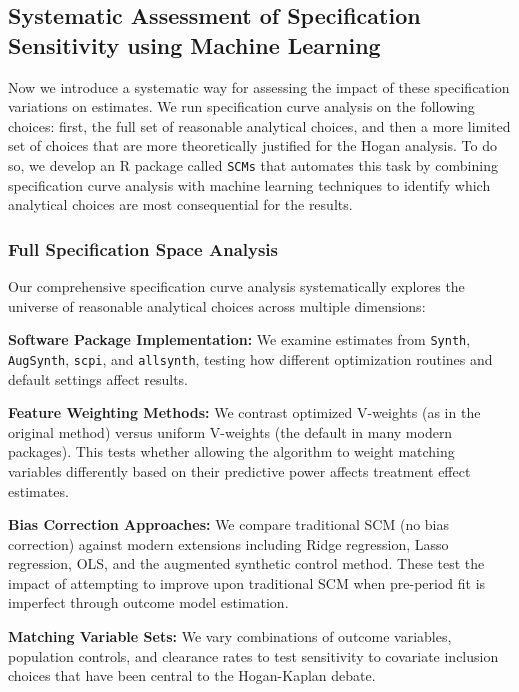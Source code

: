 \subsection{Systematic Assessment of Specification Sensitivity using Machine Learning}

Now we introduce a systematic way for assessing the impact of these specification variations on estimates. We run specification curve analysis on the following choices: first, the full set of reasonable analytical choices, and then a more limited set of choices that are more theoretically justified for the Hogan analysis. To do so, we develop an R package called \texttt{SCMs} that automates this task by combining specification curve analysis with machine learning techniques to identify which analytical choices are most consequential for the results.

\subsubsection{Full Specification Space Analysis}

Our comprehensive specification curve analysis systematically explores the universe of reasonable analytical choices across multiple dimensions:

\textbf{Software Package Implementation:} We examine estimates from \texttt{Synth}, \texttt{AugSynth}, \texttt{scpi}, and \texttt{allsynth}, testing how different optimization routines and default settings affect results.

\textbf{Feature Weighting Methods:} We contrast optimized V-weights (as in the original \citet{abadie2010synthetic} method) versus uniform V-weights (the default in many modern packages). This tests whether allowing the algorithm to weight matching variables differently based on their predictive power affects treatment effect estimates.

\textbf{Bias Correction Approaches:} We compare traditional SCM (no bias correction) against modern extensions including Ridge regression, Lasso regression, OLS, and the augmented synthetic control method. These test the impact of attempting to improve upon traditional SCM when pre-period fit is imperfect through outcome model estimation.

\textbf{Matching Variable Sets:} We vary combinations of outcome variables, population controls, and clearance rates to test sensitivity to covariate inclusion choices that have been central to the Hogan-Kaplan debate.

